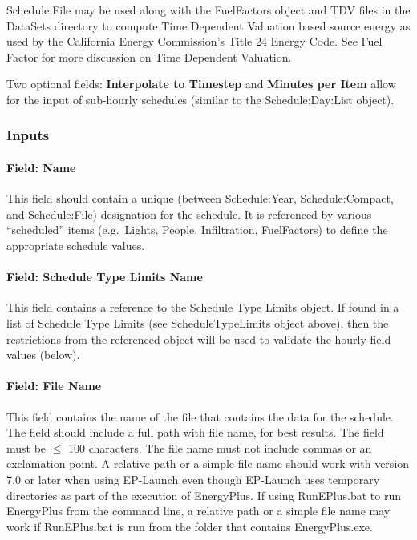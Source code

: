 Schedule:File may be used along with the FuelFactors object and TDV files in the DataSets directory to compute Time Dependent Valuation based source energy as used by the California Energy Commission's Title 24 Energy Code. See Fuel Factor for more discussion on Time Dependent Valuation.

Two optional fields: \textbf{Interpolate to Timestep} and \textbf{Minutes per Item} allow for the input of sub-hourly schedules (similar to the Schedule:Day:List object).

\subsubsection{Inputs}\label{inputs-9-019}

\paragraph{Field: Name}\label{field-name-8-018}

This field should contain a unique (between Schedule:Year, Schedule:Compact, and Schedule:File) designation for the schedule. It is referenced by various ``scheduled'' items (e.g.~Lights, People, Infiltration, FuelFactors) to define the appropriate schedule values.

\paragraph{Field: Schedule Type Limits Name}\label{field-schedule-type-limits-name-6}

This field contains a reference to the Schedule Type Limits object. If found in a list of Schedule Type Limits (see ScheduleTypeLimits object above), then the restrictions from the referenced object will be used to validate the hourly field values (below).

\paragraph{Field: File Name}\label{field-file-name}

This field contains the name of the file that contains the data for the schedule. The field should include a full path with file name, for best results. The field must be \(\le\) 100 characters. The file name must not include commas or an exclamation point. A relative path or a simple file name should work with version 7.0 or later when using EP-Launch even though EP-Launch uses temporary directories as part of the execution of EnergyPlus. If using RunEPlus.bat to run EnergyPlus from the command line, a relative path or a simple file name may work if RunEPlus.bat is run from the folder that contains EnergyPlus.exe.

